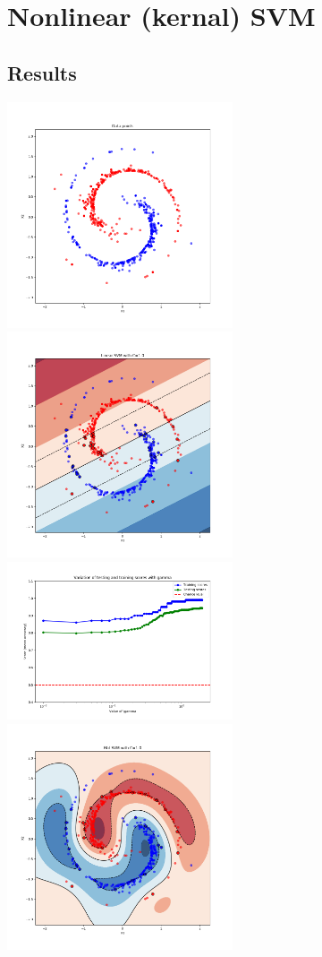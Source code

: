 \documentclass[a4paper]{article}
\begin{document}
\clearpage

\section{Nonlinear (kernal) SVM}

\subsection*{Results}

\noindent
\includegraphics[width=0.5\textwidth]{nonlinear_data.png}%
\includegraphics[width=0.5\textwidth]{linear_fit.png}\\[2em]
\includegraphics[width=0.5\textwidth]{rbf_error.png}%
\includegraphics[width=0.5\textwidth]{rbf_fit.png}\\[2em]
\end{document}
